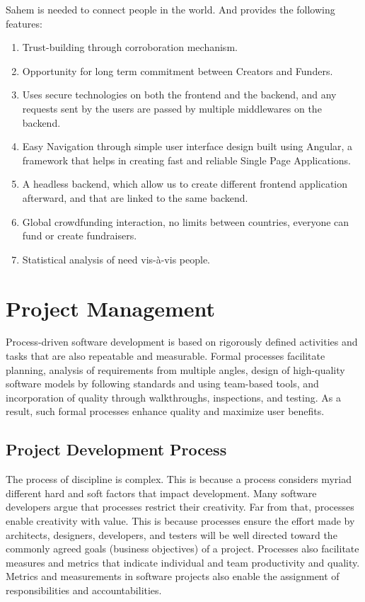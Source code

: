 Sahem is needed to connect people in the world. And provides the following features:
\begin{enumerate}
      \item
            Trust-building through corroboration mechanism.
      \item
            Opportunity for long term commitment between Creators and Funders.
      \item
            Uses secure technologies on both the frontend and the backend, and any requests sent by the users are passed by multiple middlewares on the backend.
      \item
            Easy Navigation through simple user interface design built using Angular, a framework that helps in creating fast and reliable Single Page Applications.
      \item
            A headless backend, which allow us to create different frontend application afterward, and that are linked to the same backend.
      \item
            Global crowdfunding interaction, no limits between countries, everyone can fund or create fundraisers.
      \item
            Statistical analysis of need vis-à-vis people.
\end{enumerate}
\section{ Project Management }
Process-driven software development is based on rigorously defined activities and tasks that are also repeatable and measurable. Formal processes facilitate planning, analysis of requirements from multiple angles, design of high-quality software models by following standards and using team-based tools, and incorporation of quality through walkthroughs, inspections, and testing.
As a result, such formal processes enhance quality and maximize user benefits.
\subsection{ Project Development Process }
The process of discipline is complex. This is because a process considers myriad different hard and soft factors that impact development. Many software developers argue that processes restrict their creativity. Far from that, processes enable creativity with value. This is because processes ensure the effort made by architects, designers, developers, and testers will be well directed toward the commonly agreed goals (business objectives) of a project. Processes also facilitate measures and metrics that indicate individual and team productivity and quality. Metrics and measurements in software projects also enable the assignment of responsibilities and accountabilities.
